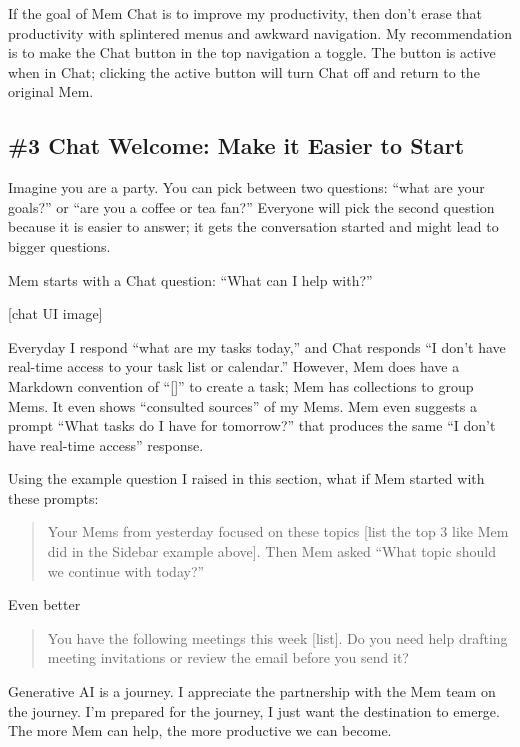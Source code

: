 \documentclass[]{tufte-handout}
\begin{document}
If the goal of Mem Chat is to improve my productivity, then don't erase
that productivity with splintered menus and awkward navigation. My
recommendation is to make the Chat button in the top navigation a
toggle. The button is active when in Chat; clicking the active button
will turn Chat off and return to the original Mem.

\hypertarget{chat-welcome-make-it-easier-to-start}{%
\subsection{\#3 Chat Welcome: Make it Easier to
Start}\label{chat-welcome-make-it-easier-to-start}}

Imagine you are a party. You can pick between two questions: ``what are
your goals?'' or ``are you a coffee or tea fan?'' Everyone will pick the
second question because it is easier to answer; it gets the conversation
started and might lead to bigger questions.

Mem starts with a Chat question: ``What can I help with?''

{[}chat UI image{]}

Everyday I respond ``what are my tasks today,'' and Chat responds ``I
don't have real-time access to your task list or calendar.'' However,
Mem does have a Markdown convention of ``{[}{]}'' to create a task; Mem
has collections to group Mems. It even shows ``consulted sources'' of my
Mems. Mem even suggests a prompt ``What tasks do I have for tomorrow?''
that produces the same ``I don't have real-time access'' response.

Using the example question I raised in this section, what if Mem started
with these prompts:

\begin{quote}
Your Mems from yesterday focused on these topics {[}list the top 3 like
Mem did in the Sidebar example above{]}. Then Mem asked ``What topic
should we continue with today?''
\end{quote}

Even better

\begin{quote}
You have the following meetings this week {[}list{]}. Do you need help
drafting meeting invitations or review the email before you send it?
\end{quote}

Generative AI is a journey. I appreciate the partnership with the Mem
team on the journey. I'm prepared for the journey, I just want the
destination to emerge. The more Mem can help, the more productive we can
become.
\end{document}

